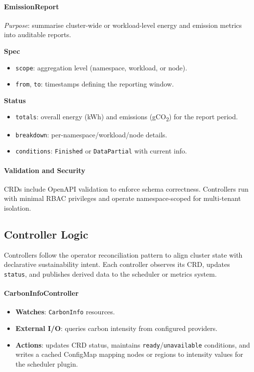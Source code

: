 \documentclass{article}
\begin{document}
\paragraph{EmissionReport}
\textit{Purpose}: summarise cluster-wide or workload-level energy and emission metrics into auditable reports.

\noindent\textbf{Spec}
\begin{itemize}
  \item \texttt{scope}: aggregation level (namespace, workload, or node).
  \item \texttt{from}, \texttt{to}: timestamps defining the reporting window.
\end{itemize}

\noindent\textbf{Status}
\begin{itemize}
  \item \texttt{totals}: overall energy (kWh) and emissions (gCO\textsubscript{2}) for the report period.
  \item \texttt{breakdown}: per-namespace/workload/node details.
  \item \texttt{conditions}: \texttt{Finished} or \texttt{DataPartial} with current info.
\end{itemize}

\paragraph{Validation and Security}
CRDs include OpenAPI validation to enforce schema correctness.
Controllers run with minimal RBAC privileges and operate
namespace-scoped for multi-tenant isolation.

\subsection{Controller Logic}

Controllers follow the operator reconciliation pattern to align cluster state with declarative sustainability intent.
Each controller observes its CRD, updates \texttt{status}, and publishes derived data to the scheduler or metrics system.

\paragraph{CarbonInfoController}
\begin{itemize}
  \item \textbf{Watches}: \texttt{CarbonInfo} resources.
  \item \textbf{External I/O}: queries carbon intensity from configured providers.
  \item \textbf{Actions}: updates CRD status, maintains \texttt{ready}/\texttt{unavailable} conditions, and writes a
        cached ConfigMap mapping nodes or regions to intensity values for the scheduler plugin.
\end{itemize}
\end{document}
